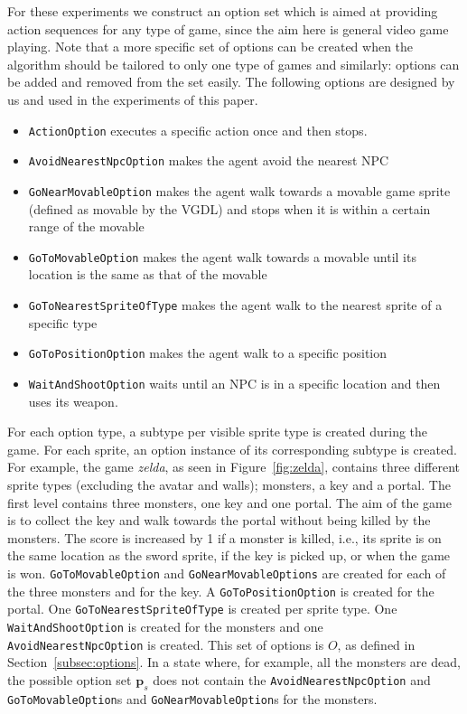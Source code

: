For these experiments we construct an option set which is aimed at providing
action sequences for any type of game, since the aim here is general video game
playing. Note that a more specific set of options can be created when the
algorithm should be tailored to only one type of games and similarly: options
can be added and removed from the set easily.  The following options are
designed by us and used in the experiments of this paper.

\begin{itemize}[noitemsep]
	\item \texttt{ActionOption} executes a specific action once and then
		stops.
	\item \texttt{AvoidNearestNpcOption} makes the agent avoid the nearest NPC
	\item \texttt{GoNearMovableOption} makes the agent walk towards a
		movable game sprite (defined as movable by the VGDL) and stops when it
		is within a certain range of the movable
	\item \texttt{GoToMovableOption} makes the agent walk towards a
		movable until its location is the same as that of the movable
	\item \texttt{GoToNearestSpriteOfType} makes the agent walk to the nearest sprite of
		a specific type
	\item \texttt{GoToPositionOption} makes the agent walk to a specific position
	\item \texttt{WaitAndShootOption} waits until an NPC is in a specific location and
		then uses its weapon.
\end{itemize}

For each option type, a subtype per visible sprite type is created during the
game. For each sprite, an option instance of its corresponding subtype is
created. For example, the game \textit{zelda}, as seen in Figure~\ref{fig:zelda},
contains three different sprite types (excluding the avatar and walls);
monsters, a key and a portal. The first level contains three monsters, one key
and one portal. The aim of the game is to collect the key and walk towards
the portal without being killed by the monsters. The score is increased by 1 if
a monster is killed, i.e., its sprite is on the same location as the sword
sprite, if the key is picked up, or when the game is won.
\texttt{GoToMovableOption} and \texttt{GoNearMovableOptions} are created for
each of the three monsters and for the key. A \texttt{GoToPositionOption} is
created for the portal.  One \texttt{GoToNearestSpriteOfType} is created per
sprite type. One \texttt{WaitAndShootOption} is created for the monsters and
one \texttt{AvoidNearestNpc\-Option} is created. This set of options is $O$, as
defined in Section~\ref{subsec:options}. In a state where, for example, all the
monsters are dead, the possible option set $\mathbf{p}_s$ does not contain the
\texttt{AvoidNearestNpcOption} and \texttt{GoToMovableOption}s and
\texttt{GoNearMovableOption}s for the monsters.


